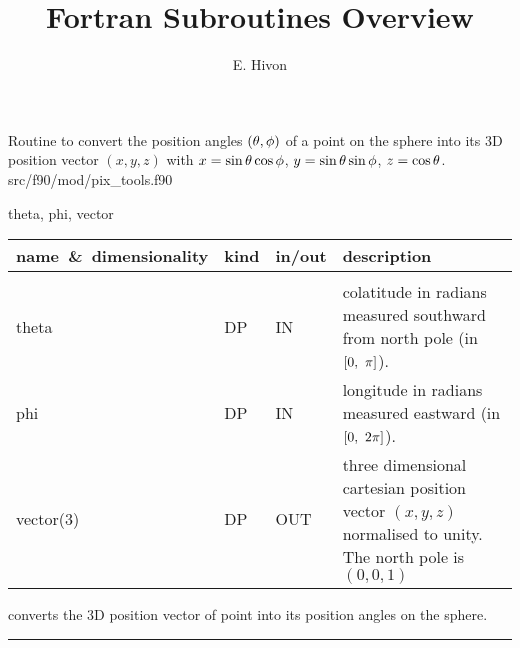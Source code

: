 

\sloppy


\title{\healpix Fortran Subroutines Overview}
 \section[ang2vec]{ }
\label{sub:ang2vec}
\author{E. Hivon}

\begin{facility}
{Routine to convert the position angles $(\theta,\phi)$ of a point on the sphere 
into its 3D position vector $(x,y,z)$ with
$x = \sin\theta\cos\phi$, $y=\sin\theta\sin\phi$, $z=\cos\theta$. 
}
{src/f90/mod/pix\_tools.f90}
\end{facility}

\begin{f90format}
{theta, phi, vector}
\end{f90format}


\begin{arguments}
{
\begin{tabular}{p{0.4\hsize} p{0.05\hsize} p{0.1\hsize} p{0.35\hsize}} \hline  
\textbf{name~\&~dimensionality} & \textbf{kind} & \textbf{in/out} & \textbf{description} \\ \hline
                   &   &   &                           \\ %
theta & DP & IN & colatitude in radians measured southward from north pole (in
    $[0,\ \pi]\myhtmlimage{}$). \\
phi   & DP & IN & longitude in radians measured eastward (in $[0,\ 2\pi]$).\\
vector(3) & DP & OUT & three dimensional cartesian position vector
                   $(x,y,z)$ normalised to unity. The north pole is $(0,0,1)$
\end{tabular}
}
\end{arguments}


\begin{related}
  \begin{sulist}{} %
  \item[\htmlref{vec2ang}{sub:vec2ang}] converts the 3D position vector of point into its position
  angles on the sphere.
  \end{sulist}
\end{related}

\rule{\hsize}{2mm}

